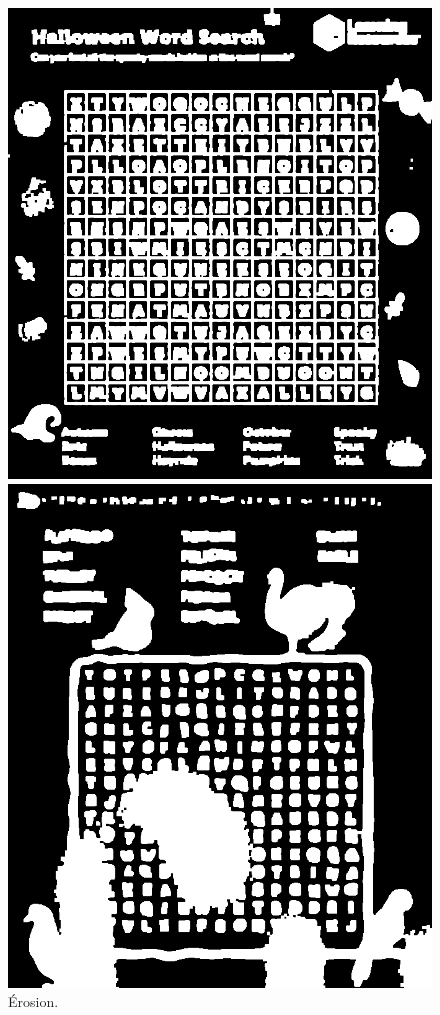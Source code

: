 \documentclass{article}
\begin{document}
\begin{figure}[H]
  \centering
      \includegraphics[width=\linewidth]{ressources/image_2_word_detection_09_eroded.png}
      \caption{}
    \endminipage\quad\quad\quad\quad
    \includegraphics[width=\linewidth]{ressources/image_3_word_detection_09_eroded.png}
    \caption{}
  \endminipage
  \caption{Érosion.}
\end{figure}
\end{document}
